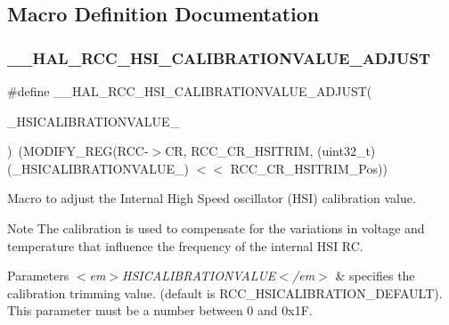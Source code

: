 \subsection{Macro Definition Documentation}
\mbox{\label{group___r_c_c___h_s_i___configuration_ga36991d340af7ad14b79f204c748b0e3e}} 
\subsubsection{\texorpdfstring{\+\_\+\+\_\+\+H\+A\+L\+\_\+\+R\+C\+C\+\_\+\+H\+S\+I\+\_\+\+C\+A\+L\+I\+B\+R\+A\+T\+I\+O\+N\+V\+A\+L\+U\+E\+\_\+\+A\+D\+J\+U\+ST}{\_\_HAL\_RCC\_HSI\_CALIBRATIONVALUE\_ADJUST}}
{\footnotesize\ttfamily \#define \+\_\+\+\_\+\+H\+A\+L\+\_\+\+R\+C\+C\+\_\+\+H\+S\+I\+\_\+\+C\+A\+L\+I\+B\+R\+A\+T\+I\+O\+N\+V\+A\+L\+U\+E\+\_\+\+A\+D\+J\+U\+ST(\begin{DoxyParamCaption}\item[{}]{\+\_\+\+H\+S\+I\+C\+A\+L\+I\+B\+R\+A\+T\+I\+O\+N\+V\+A\+L\+U\+E\+\_\+ }\end{DoxyParamCaption})~(M\+O\+D\+I\+F\+Y\+\_\+\+R\+EG(R\+CC-\/$>$CR, R\+C\+C\+\_\+\+C\+R\+\_\+\+H\+S\+I\+T\+R\+IM, (uint32\+\_\+t)(\+\_\+\+H\+S\+I\+C\+A\+L\+I\+B\+R\+A\+T\+I\+O\+N\+V\+A\+L\+U\+E\+\_\+) $<$$<$ R\+C\+C\+\_\+\+C\+R\+\_\+\+H\+S\+I\+T\+R\+I\+M\+\_\+\+Pos))}



Macro to adjust the Internal High Speed oscillator (H\+SI) calibration value. 

\begin{DoxyNote}{Note}
The calibration is used to compensate for the variations in voltage and temperature that influence the frequency of the internal H\+SI RC. 
\end{DoxyNote}

\begin{DoxyParams}{Parameters}
{\em $<$em$>$\+H\+S\+I\+C\+A\+L\+I\+B\+R\+A\+T\+I\+O\+N\+V\+A\+L\+U\+E$<$/em$>$} & specifies the calibration trimming value. (default is R\+C\+C\+\_\+\+H\+S\+I\+C\+A\+L\+I\+B\+R\+A\+T\+I\+O\+N\+\_\+\+D\+E\+F\+A\+U\+LT). This parameter must be a number between 0 and 0x1F. \\
\hline
\end{DoxyParams}


